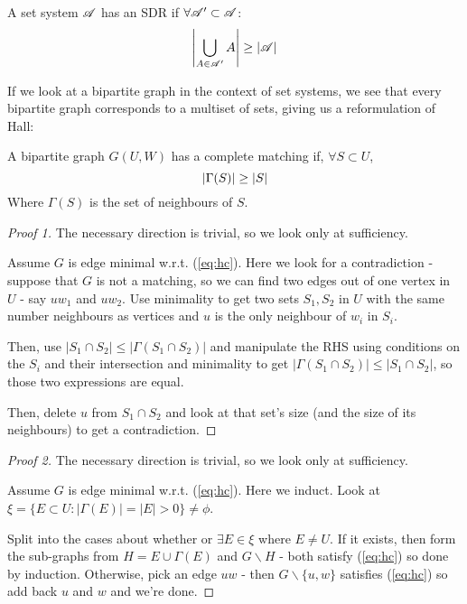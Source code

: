 \documentclass[a4paper]{article}
\begin{document}
{\begin{thm-num}[Hall, 1935]
	A set system $\mathscr{A}$ has an SDR if $\forall\mathscr{A}'\subset\mathscr{A}$:
	$$\left|\bigcup_{A\in\mathscr{A}'}A\right|\geq\left|\mathscr{A}\right|$$
\end{thm-num}

If we look at a bipartite graph in the context of set systems, we see that every bipartite graph corresponds to a multiset of sets, giving us a reformulation of Hall:

\addtocounter{cor-num}{-1}
\begin{thm-num}
	A bipartite graph $G(U,W)$ has a complete matching if, $\forall S\subset U$,
	\begin{equation}\index{Hall!criterion}\label{eq:hc}
		\left|\Gamma(S)\right|\geq|S|
	\end{equation}
	Where $\Gamma(S)$ is the set of neighbours of $S$.
\end{thm-num}
\begin{proof}[Proof 1]
	The necessary direction is trivial, so we look only at sufficiency.
	
	Assume $G$ is edge minimal w.r.t. (\ref{eq:hc}). Here we look for a contradiction - suppose that $G$ is not a matching, so we can find two edges out of one vertex in $U$ - say $uw_1$ and $uw_2$. Use minimality to get two sets $S_1, S_2$ in $U$ with the same number neighbours as vertices and $u$ is the only neighbour of $w_i$ in $S_i$.
	
	Then, use $\left|S_1\cap S_2\right|\leq\left|\Gamma\left(S_1\cap S_2\right)\right|$ and manipulate the RHS using conditions on the $S_i$ and their intersection and minimality to get $\left|\Gamma\left(S_1\cap S_2\right)\right|\leq\left|S_1\cap S_2\right|$, so those two expressions are equal.
	
	Then, delete $u$ from $S_1\cap S_2$ and look at that set's size (and the size of its neighbours) to get a contradiction.
\end{proof}
\begin{proof}[Proof 2]
	The necessary direction is trivial, so we look only at sufficiency.
		
	Assume $G$ is edge minimal w.r.t. (\ref{eq:hc}). Here we induct. Look at $\xi=\{E\subset U : \left|\Gamma(E)\right|=|E|>0\}\neq\phi$.
	
	Split into the cases about whether or $\exists E\in \xi$ where $E\neq U$. If it exists, then form the sub-graphs from $H=E\cup\Gamma(E)$ and $G\smallsetminus H$ - both satisfy (\ref{eq:hc}) so done by induction. Otherwise, pick an edge $uw$ - then $G\smallsetminus \{u,w\}$ satisfies (\ref{eq:hc}) so add back $u$ and $w$ and we're done.
\end{proof}

}
\end{document}
